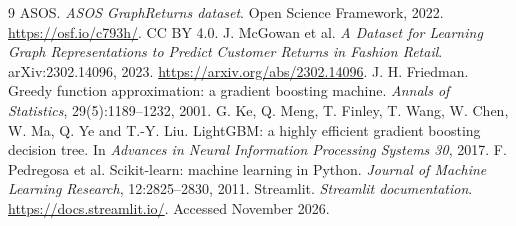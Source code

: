 \documentclass[11pt,a4paper]{article}
\begin{document}
\small
\begin{thebibliography}{9}
 ASOS. \emph{ASOS GraphReturns dataset}. Open Science Framework, 2022. \url{https://osf.io/c793h/}. CC BY 4.0.
 J. McGowan et al. \emph{A Dataset for Learning Graph Representations to Predict Customer Returns in Fashion Retail}. arXiv:2302.14096, 2023. \url{https://arxiv.org/abs/2302.14096}.
 J. H. Friedman. Greedy function approximation: a gradient boosting machine. \emph{Annals of Statistics}, 29(5):1189--1232, 2001.
 G. Ke, Q. Meng, T. Finley, T. Wang, W. Chen, W. Ma, Q. Ye and T.-Y. Liu. LightGBM: a highly efficient gradient boosting decision tree. In \emph{Advances in Neural Information Processing Systems 30}, 2017.
 F. Pedregosa et al. Scikit-learn: machine learning in Python. \emph{Journal of Machine Learning Research}, 12:2825--2830, 2011.
 Streamlit. \emph{Streamlit documentation}. \url{https://docs.streamlit.io/}. Accessed November 2026.
\end{thebibliography}
\end{document}
